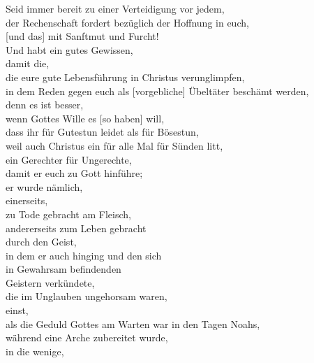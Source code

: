     Seid immer bereit zu einer Verteidigung vor jedem, \\
        der Rechenschaft fordert bezüglich der Hoffnung in euch, \\
        [und das] mit Sanftmut und Furcht! \\
        Und habt ein gutes Gewissen, \\
            damit die, \\
            die eure gute Lebensführung in Christus verunglimpfen, \\
            in dem Reden gegen euch als [vorgebliche] Übeltäter beschämt werden, \\
        denn es ist besser, \\
            wenn Gottes Wille es [so haben] will, \\
            dass ihr für Gutestun leidet als für Bösestun, \\
                weil auch Christus ein für alle  Mal für Sünden litt, \\
                    ein Gerechter für Ungerechte, \\
                    damit er euch zu Gott hinführe; \\
                    er wurde nämlich, \\
                    einerseits, \\
                        zu Tode gebracht am  Fleisch, \\
                    andererseits zum Leben gebracht \\
                        durch  den Geist, \\
                         in dem er auch hinging und den sich \\
                        in Gewahrsam befindenden \\
                        Geistern verkündete, \\
                        die im Unglauben ungehorsam waren, \\
                        einst, \\
                        als die Geduld Gottes am Warten war in den Tagen Noahs, \\
                        während eine Arche zubereitet wurde, \\
                        in die wenige, \\
